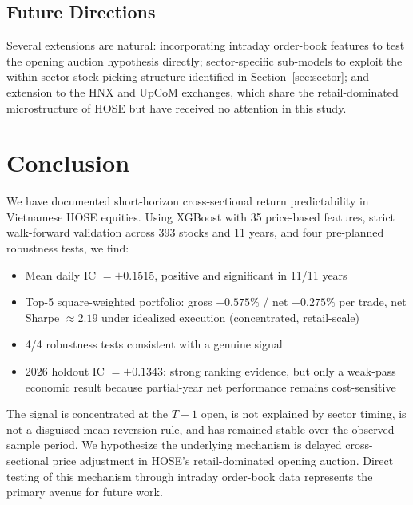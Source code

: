\documentclass[12pt,a4paper]{article}
\begin{document}
\subsection{Future Directions}
Several extensions are natural: incorporating intraday order-book features to
test the opening auction hypothesis directly; sector-specific sub-models to exploit
the within-sector stock-picking structure identified in Section~\ref{sec:sector};
and extension to the HNX and UpCoM exchanges, which share the retail-dominated
microstructure of HOSE but have received no attention in this study.

\section{Conclusion}
\label{sec:conclusion}

We have documented short-horizon cross-sectional return predictability in Vietnamese
HOSE equities. Using XGBoost with 35 price-based features, strict walk-forward
validation across 393 stocks and 11 years, and four pre-planned robustness tests,
we find:

\begin{itemize}
  \item Mean daily IC $= +0.1515$, positive and significant in 11/11 years
  \item Top-5 square-weighted portfolio: gross $+0.575\%$ / net $+0.275\%$ per trade,
        net Sharpe $\approx 2.19$ under idealized execution (concentrated, retail-scale)
  \item 4/4 robustness tests consistent with a genuine signal
  \item 2026 holdout IC $= +0.1343$: strong ranking evidence, but only a weak-pass
        economic result because partial-year net performance remains cost-sensitive
\end{itemize}

The signal is concentrated at the $T+1$ open, is not explained by sector timing,
is not a disguised mean-reversion rule, and has remained stable over the observed
sample period. We hypothesize the underlying mechanism is delayed cross-sectional
price adjustment in HOSE's retail-dominated opening auction.
Direct testing of this mechanism through intraday order-book data represents the
primary avenue for future work.



\end{document}
